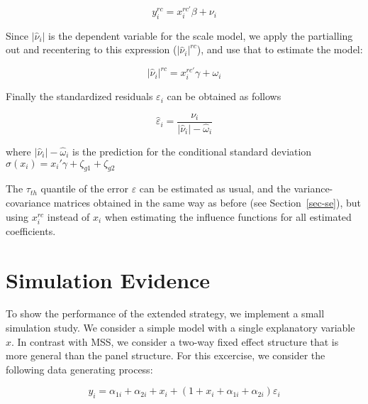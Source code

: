 \documentclass[
  authoryear,
  review,
  1p]{elsarticle}
\begin{document}
\[y_{i}^{rc} = x_{i}^{rc'} \beta + \nu_{i}
\]

Since \(|\hat \nu_i|\) is the dependent variable for the scale model, we
apply the partialling out and recentering to this expression
(\(|\hat \nu_i|^{rc}\)), and use that to estimate the model:

\[|\hat\nu_{i}|^{rc} = x_{i}^{rc'} \gamma + \omega_{i}\]

Finally the standardized residuals \(\varepsilon_i\) can be obtained as
follows

\[\hat{\varepsilon}_{i} = \frac{\nu_{i}}{|\hat\nu_{i}|- \hat \omega_{i}}\]

where \(|\hat\nu_{i}|- \hat \omega_{i}\) is the prediction for the
conditional standard deviation
\(\sigma(x_i)=x_{i}' \gamma + \zeta_{g1} + \zeta_{g2}\)

The \(\tau_{th}\) quantile of the error \(\varepsilon\) can be estimated
as usual, and the variance-covariance matrices obtained in the same way
as before (see Section~\ref{sec-se}), but using \(x_{i}^{rc}\) instead
of \(x_{i}\) when estimating the influence functions for all estimated
coefficients.

\hypertarget{simulation-evidence}{%
\section{Simulation Evidence}\label{simulation-evidence}}

To show the performance of the extended strategy, we implement a small
simulation study. We consider a simple model with a single explanatory
variable \(x\). In contrast with MSS, we consider a two-way fixed effect
structure that is more general than the panel structure. For this
excercise, we consider the following data generating process:

\[y_i = \alpha_{1i} + \alpha_{2i} + x_i + (1+x_i + \alpha_{1i} + \alpha_{2i} ) \varepsilon_i
\]
\end{document}
